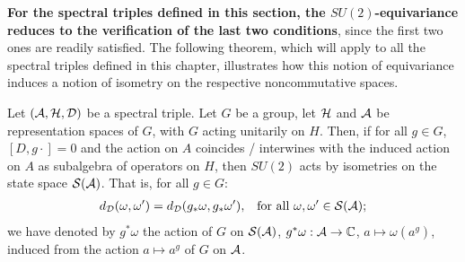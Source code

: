 \textbf{For the spectral triples defined in this section, the $SU(2)$-equivariance reduces to the verification of the last two conditions}, since the first two ones are readily satisfied. The following theorem, which will apply to all the spectral triples defined in this chapter, illustrates how this notion of equivariance induces a notion of isometry on the respective noncommutative spaces.

\begin{theorem} \label{theoGInvariantDistance}
Let $(\mathcal A, \mathcal H, \mathcal D)$ be a spectral triple. Let $G$ be a group, let $\mathcal H$ and $\mathcal A$ be representation spaces of $G$, with $G$ acting unitarily on $H$. Then, if for all $g \in G$, $[D, g\cdot] = 0$ and the action on $A$ coincides / interwines with the induced action on $A$ as subalgebra of operators on $H$, then $SU(2)$ acts by isometries on the state space $\mathcal S(\mathcal A)$. That is, for all $g \in G$:
\begin{align}
    d_\mathcal D(\omega, \omega') &= d_\mathcal D(g_* \omega, g_*\omega'), & \text{for all $\omega, \omega' \in \mathcal S(\mathcal A)$};
\end{align}
we have denoted by $g^*\omega$ the action of $G$ on $\mathcal S(\mathcal A)$, $g^* \omega: \mathcal A \to \mathbb{C}$, $a \mapsto \omega(a^g)$, induced from the action $a \mapsto a^g$ of $G$ on $\mathcal A$.
\end{theorem}

